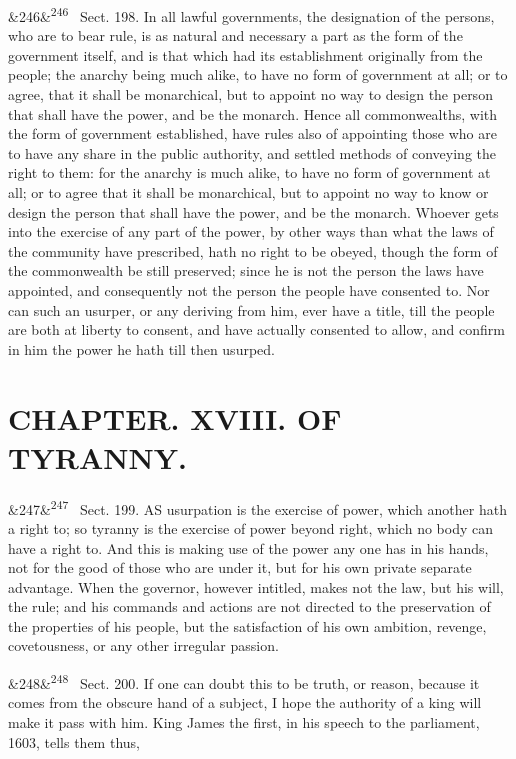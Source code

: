 \documentclass[12pt]{article}
\newcommand{\para}[1][]{\par\noindent\ifx&#1&\else\textsuperscript{\footnotesize #1}~\fi}
\begin{document}
\para[246] Sect. 198. In all lawful governments, the designation of the persons, who are to bear rule, is as natural and necessary a part as the form of the government itself, and is that which had its establishment originally from the people; the anarchy being much alike, to have no form of government at all; or to agree, that it shall be monarchical, but to appoint no way to design the person that shall have the power, and be the monarch. Hence all commonwealths, with the form of government established, have rules also of appointing those who are to have any share in the public authority, and settled methods of conveying the right to them: for the anarchy is much alike, to have no form of government at all; or to agree that it shall be monarchical, but to appoint no way to know or design the person that shall have the power, and be the monarch. Whoever gets into the exercise of any part of the power, by other ways than what the laws of the community have prescribed, hath no right to be obeyed, though the form of the commonwealth be still preserved; since he is not the person the laws have appointed, and consequently not the person the people have consented to. Nor can such an usurper, or any deriving from him, ever have a title, till the people are both at liberty to consent, and have actually consented to allow, and confirm in him the power he hath till then usurped.

\section*{CHAPTER. XVIII. OF TYRANNY.}

\para[247] Sect. 199. AS usurpation is the exercise of power, which another hath a right to; so tyranny is the exercise of power beyond right, which no body can have a right to. And this is making use of the power any one has in his hands, not for the good of those who are under it, but for his own private separate advantage. When the governor, however intitled, makes not the law, but his will, the rule; and his commands and actions are not directed to the preservation of the properties of his people, but the satisfaction of his own ambition, revenge, covetousness, or any other irregular passion.

\para[248] Sect. 200. If one can doubt this to be truth, or reason, because it comes from the obscure hand of a subject, I hope the authority of a king will make it pass with him. King James the first, in his speech to the parliament, 1603, tells them thus,
\end{document}
